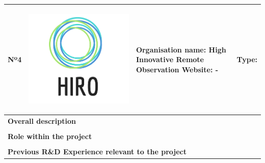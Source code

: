 \begin{longtable}[H]{|p{0.7cm}|p{4cm}|p{7cm}|p{1.3cm}|}
	\hline
	\begin{center} Nº4 \end{center} & \begin{center} \includegraphics[scale=0.07]{./logos/logo} \end{center} & \begin{center} \textbf{Organisation name:} High Innovative Remote Observation \newline \textbf{Website:} - \end{center} & \begin{center} Type: \end{center} \\ \hline
	
	\multicolumn{4}{|p{13cm}|}{\textbf{Overall description}}  \\ \hline
	
	\multicolumn{4}{|p{13cm}|}{}  \\ \hline
	
	\multicolumn{4}{|p{13cm}|}{\textbf{Role within the project}}   \\ \hline
	
	\multicolumn{4}{|p{13cm}|}{}  \\ \hline
	
	\multicolumn{4}{|p{13cm}|}{\textbf{Previous R\&D Experience relevant to the project}}  \\ \hline
	

\end{longtable}
